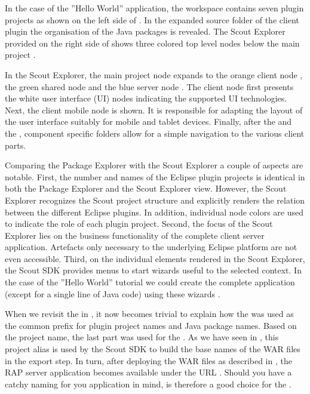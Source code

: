 \documentclass[a4paper,10pt,twoside]{book}
\begin{document}
In the case of the ''Hello World'' application, the workspace contains seven plugin projects as shown on the left side of .
In the expanded source folder of the client plugin  the organisation of the Java packages is revealed.
The Scout Explorer provided on the right side of  shows three colored top level nodes below the main project .

In the Scout Explorer, the main project node expands to the orange client node , the green shared node  and the blue server node .
The client node first presents the white user interface (UI) nodes  indicating the supported UI technologies.
Next, the client mobile node  is shown.
It is responsible for adapting the layout of the user interface suitably for mobile and tablet devices.
Finally, after the  and the , component specific folders allow for a simple navigation to the various client parts.

Comparing the Package Explorer with the Scout Explorer a couple of aspects are notable.
First, the number and names of the Eclipse plugin projects is identical in both the Package Explorer and the Scout Explorer view.
However, the Scout Explorer recognizes the Scout project structure and explicitly renders the relation between the different Eclipse plugins.
In addition, individual node colors are used to indicate the role of each plugin project.
Second, the focus of the Scout Explorer lies on the business functionality of the complete client server application.
Artefacts only necessary to the underlying Eclipse platform are not even accessible.
Third, on the individual elements rendered in the Scout Explorer, the Scout SDK provides menus to start wizards useful to the selected context.
In the case of the ''Hello World'' tutorial we could create the complete application (except for a single line of Java code) using these wizards .

When we revisit the  in , it now becomes trivial to explain how the   was used as the common prefix for plugin project names and Java package names.
Based on the project name, the last part  was used for the .
As we have seen in , this project alias is used by the Scout SDK to build the base names of the WAR files in the export step.
In turn, after deploying the WAR files as described in , the RAP server application becomes available under the URL .
Should you have a catchy naming for you application in mind,  is therefore a good choice for the .
\end{document}
